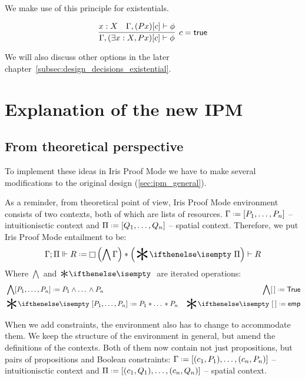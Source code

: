 We make use of this principle for existentials.

\[
\infer[c = \true]
      {\Gamma, (\exists x : X, P x)[c] \vdash \phi}
      {x : X &
       \Gamma, (P x)[c] \vdash \phi}
\]

We will also discuss other options in the later chapter~\ref{subsec:design_decisions_existential}.


\section{Explanation of the new IPM}

\subsection{From theoretical perspective}

To implement these ideas in Iris Proof Mode we have to make several modifications to the original design (\ref{sec:ipm_general}).

As a reminder, from theoretical point of view, Iris Proof Mode environment consists of two contexts, both of which are lists of resources.
\(\IntuD \defeq [\dd P n]\) -- intuitionisctic context and \(\SpatD \defeq [\dd Q n]\) -- spatial context.
Therefore, we put Iris Proof Mode entailment to be: \[\entailsD R \defeq \intuit \left(\bigwedge \IntuD\right) * \left(\Sep \SpatD\right) \vdash R\]
Where \(\bigwedge\) and \(\Sep\) are iterated operations:
\begin{align*}
  & \bigwedge  [\dd P n] \defeq P_1 \wedge \dots\, \wedge P_n
  & \bigwedge [\,] \defeq \True \\
  & \Sep {[\dd P n]} \defeq P_1 * \dots\, * P_n
  & \Sep {[\,]} \defeq \emp
\end{align*}

When we add constraints, the environment also has to change to accommodate them.
We keep the structure of the environment in general, but amend the definitions of the contexts.
Both of them now contain not just propositions, but pairs of propositions and Boolean constraints:
\(\IntuD \defeq [(c_1,P_1),\dots,(c_n,P_n)]\) -- intuitionisctic context and \(\SpatD \defeq [(c_1,Q_1),\dots,(c_n,Q_n)]\) -- spatial context.

